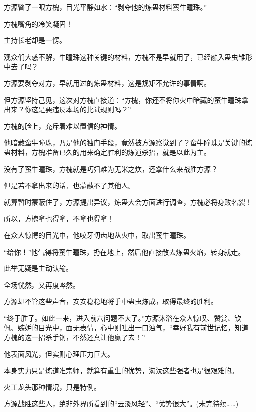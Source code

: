 \begin{this_body}
方源瞥了一眼方槐，目光平静如水：“剥夺他的炼蛊材料蛮牛瞳珠。”

方槐嘴角的冷笑凝固！

主持长老却是一愣。

观众们大惑不解，牛瞳珠这种关键的材料，方槐不是早就用了，已经融入蛊虫雏形中去了吗？

方源要剥夺对方，早就用过的炼蛊材料，这是规矩不允许的事情啊。

但方源坚持己见，这次对方槐直接道：“方槐，你还不将你火中暗藏的蛮牛瞳珠拿出来？你这是要违反本场的比试规则吗？”

方槐的脸上，充斥着难以置信的神情。

他暗藏蛮牛瞳珠，乃是他的独门手段，竟然被方源察觉到了？蛮牛瞳珠是关键的炼蛊材料，方槐准备已久的用来确定胜利的炼道杀招，就是以此为主。

没有了蛮牛瞳珠，方槐就是巧妇难为无米之炊，还拿什么来战胜方源？

但是若不拿出来的话，也蒙蔽不了其他人。

就算暂时蒙蔽住了，方源提出异议，炼蛊大会方面进行调查，方槐必将身败名裂！

所以，方槐拿也得拿，不拿也得拿！

在众人惊愕的目光中，他咬牙切齿地从火中，取出蛮牛瞳珠。

“给你！”他气得将蛮牛瞳珠，扔在地上，然后他直接散去炼蛊火焰，转身就走。

此举无疑是主动认输。

全场恍然，又再度哗然。

方源却不管这些声音，安安稳稳地将手中蛊虫炼成，取得最终的胜利。

“终于胜了。如此一来，进入前六问题不大了。”方源沐浴在众人惊叹、赞赏、钦佩、嫉妒的目光中，面无表情，心中则吐出一口浊气，“幸好我有前世记忆，知道方槐的这一招杀手锏，不然还真让他赢了去！”

他表面风光，但实则心理压力巨大。

本身实力只是炼道准宗师，就算有重生的优势，淘汰这些强者也是很艰难的。

火工龙头那种情况，只是特例。

方源战胜这些人，绝非外界所看到的“云淡风轻”、“优势很大”。(未完待续……)

\end{this_body}


